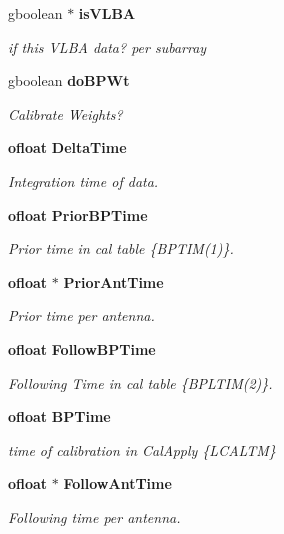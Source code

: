 \begin{CompactItemize}
gboolean $\ast$ {\bf is\-VLBA}
\begin{CompactList}\small\item\em if this VLBA data? per subarray \item\end{CompactList}\item 
gboolean {\bf do\-BPWt}
\begin{CompactList}\small\item\em Calibrate Weights? \item\end{CompactList}\item 
{\bf ofloat} {\bf Delta\-Time}
\begin{CompactList}\small\item\em Integration time of data. \item\end{CompactList}\item 
{\bf ofloat} {\bf Prior\-BPTime}
\begin{CompactList}\small\item\em Prior time in cal table \{BPTIM(1)\}. \item\end{CompactList}\item 
{\bf ofloat} $\ast$ {\bf Prior\-Ant\-Time}
\begin{CompactList}\small\item\em Prior time per antenna. \item\end{CompactList}\item 
{\bf ofloat} {\bf Follow\-BPTime}
\begin{CompactList}\small\item\em Following Time in cal table \{BPLTIM(2)\}. \item\end{CompactList}\item 
{\bf ofloat} {\bf BPTime}
\begin{CompactList}\small\item\em time of calibration in Cal\-Apply \{LCALTM\} \item\end{CompactList}\item 
{\bf ofloat} $\ast$ {\bf Follow\-Ant\-Time}
\begin{CompactList}\small\item\em Following time per antenna. \item\end{CompactList}\item 

\end{CompactItemize}
